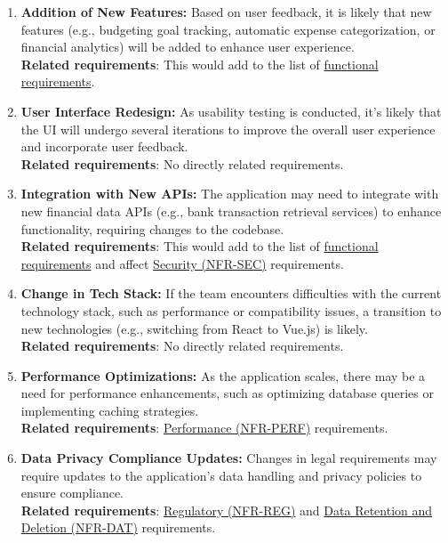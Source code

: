 \documentclass[12pt]{article}
\begin{document}
\begin{enumerate}[label=LC\arabic*]
	\item\textbf{Addition of New Features:} Based on user feedback, it is likely
	that new features (e.g., budgeting goal tracking, automatic expense
	categorization, or financial analytics) will be added to enhance user
	experience.\\
  \textbf{Related requirements}: This would add to the list of
  \hyperref[sec_funcReq]{functional requirements}.

	\item\textbf{User Interface Redesign:} As usability testing is conducted, it's
	likely that the UI will undergo several iterations to improve the overall user
	experience and incorporate user feedback.\\
  \textbf{Related requirements}: No directly related requirements.

	\item \textbf{Integration with New APIs:} The application may need to
	integrate with new financial data APIs (e.g., bank transaction retrieval
	services) to enhance functionality, requiring changes to the codebase. \\
  \textbf{Related requirements}: This would add to the list of
  \hyperref[sec_funcReq]{functional requirements} and affect
  \hyperref[NFR-SEC]{Security (NFR-SEC)} requirements.

	\item \textbf{Change in Tech Stack:} If the team encounters difficulties with
	the current technology stack, such as performance or compatibility issues, a
	transition to new technologies (e.g., switching from React to Vue.js) is
	likely.\\
  \textbf{Related requirements}: No directly related requirements.

	\item \textbf{Performance Optimizations:} As the application scales, there may
	be a need for performance enhancements, such as optimizing database queries or
	implementing caching strategies. \\
  \textbf{Related requirements}: \hyperref[NFR-PERF]{Performance (NFR-PERF)}
  requirements.

	\item\textbf{Data Privacy Compliance Updates:} Changes in legal requirements
	may require updates to the application's data handling and privacy policies to
	ensure compliance.\\
  \textbf{Related requirements}: \hyperref[NFR-REG]{Regulatory (NFR-REG)} and
  \hyperref[NFR-DAT]{Data Retention and Deletion (NFR-DAT)} requirements.


\end{enumerate}
\end{document}
